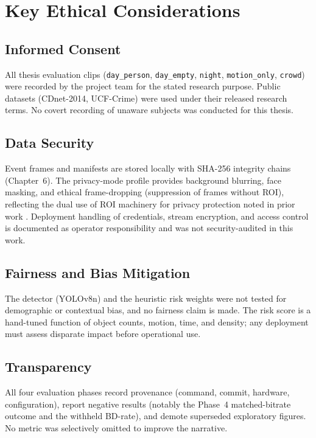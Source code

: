 \section{Key Ethical Considerations}

\subsection{Informed Consent}

All thesis evaluation clips (\texttt{day\_person}, \texttt{day\_empty}, \texttt{night}, \texttt{motion\_only}, \texttt{crowd}) were recorded by the project team for the stated research purpose. Public datasets (CDnet-2014, UCF-Crime) were used under their released research terms. No covert recording of unaware subjects was conducted for this thesis.

\subsection{Data Security}

Event frames and manifests are stored locally with SHA-256 integrity chains (Chapter~6). The privacy-mode profile provides background blurring, face masking, and ethical frame-dropping (suppression of frames without ROI), reflecting the dual use of ROI machinery for privacy protection noted in prior work \cite{Ma2016Lossless}. Deployment handling of credentials, stream encryption, and access control is documented as operator responsibility and was not security-audited in this work.

\subsection{Fairness and Bias Mitigation}

The detector (YOLOv8n) and the heuristic risk weights were not tested for demographic or contextual bias, and no fairness claim is made. The risk score is a hand-tuned function of object counts, motion, time, and density; any deployment must assess disparate impact before operational use.

\subsection{Transparency}

All four evaluation phases record provenance (command, commit, hardware, configuration), report negative results (notably the Phase~4 matched-bitrate outcome and the withheld BD-rate), and demote superseded exploratory figures. No metric was selectively omitted to improve the narrative.


